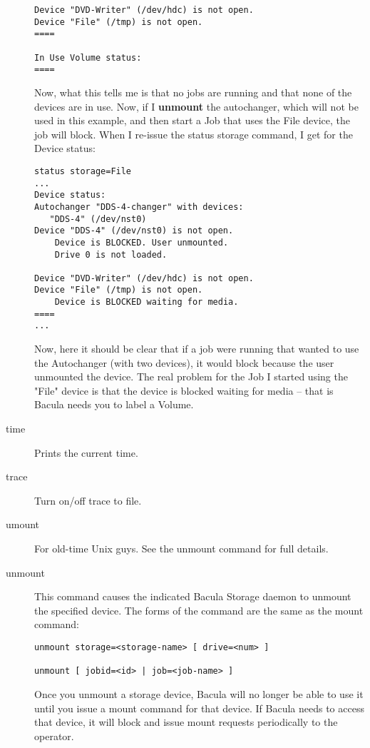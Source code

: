\begin{description}
\begin{verbatim}
Device "DVD-Writer" (/dev/hdc) is not open.
Device "File" (/tmp) is not open.
====

In Use Volume status:
====
\end{verbatim}
\normalsize

Now, what this tells me is that no jobs are running and that none of
the devices are in use.  Now, if I {\bf unmount} the autochanger, which
will not be used in this example, and then start a Job that uses the
File device, the job will block.  When I re-issue the status storage
command, I get for the Device status:

\footnotesize
\begin{verbatim}
status storage=File
...
Device status:
Autochanger "DDS-4-changer" with devices:
   "DDS-4" (/dev/nst0)
Device "DDS-4" (/dev/nst0) is not open.
    Device is BLOCKED. User unmounted.
    Drive 0 is not loaded.

Device "DVD-Writer" (/dev/hdc) is not open.
Device "File" (/tmp) is not open.
    Device is BLOCKED waiting for media.
====
...
\end{verbatim}
\normalsize

Now, here it should be clear that if a job were running that wanted
to use the Autochanger (with two devices), it would block because
the user unmounted the device. The real problem for the Job I started
using the "File" device is that the device is blocked waiting for
media -- that is Bacula needs you to label a Volume.

\item [time]
   Prints the current time.

\item [trace]
   Turn on/off trace to file.

\item [umount]
   For old-time Unix guys.  See the unmount command for full details.

\item [unmount]
   This command causes the indicated Bacula Storage  daemon to unmount the
   specified device. The forms of the command  are the same as the mount command:
\footnotesize
\begin{verbatim}
unmount storage=<storage-name> [ drive=<num> ]

unmount [ jobid=<id> | job=<job-name> ]
\end{verbatim}
\normalsize

   Once you unmount a storage device, Bacula will no longer be able to use
   it until you issue a mount command for that device. If Bacula needs to
   access that device, it will block and issue mount requests periodically
   to the operator.


\end{description}

